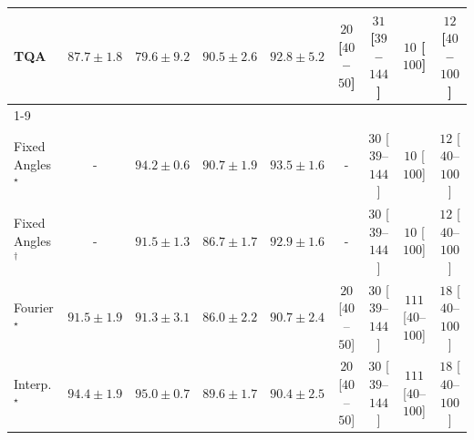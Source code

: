 \begin{tabular}{l|cccc|cccc|}
TQA & {\cellcolor[HTML]{EE7617}} \color[HTML]{F1F1F1} $87.7\pm 1.8$ & {\cellcolor[HTML]{FED36F}} \color[HTML]{000000} $79.6\pm 9.2$ & {\cellcolor[HTML]{D75908}} \color[HTML]{F1F1F1} $90.5\pm 2.6$ & {\cellcolor[HTML]{BC4503}} \color[HTML]{F1F1F1} $92.8\pm 5.2$ & {\cellcolor[HTML]{FDE4E1}} \color[HTML]{000000} $20$ [$40$--$50$] & {\cellcolor[HTML]{FDD8D5}} \color[HTML]{000000} $31$ [$39$--$144$] & {\cellcolor[HTML]{FEEEEB}} \color[HTML]{000000} $10$ [$100$] & {\cellcolor[HTML]{FEECE9}} \color[HTML]{000000} $12$ [$40$--$100$] \\
\cline{1-9}
\multicolumn{9}{c}{\rule{0pt}{8pt}PP} \\
\midrule
Fixed Angles$^\star$ & {\cellcolor[HTML]{000000}} \color[HTML]{F1F1F1} {\cellcolor{white}} \color{black} - & {\cellcolor[HTML]{0A703A}} \color[HTML]{F1F1F1} $94.2\pm 0.6$ & {\cellcolor[HTML]{2C8F4B}} \color[HTML]{F1F1F1} $90.7\pm 1.9$ & {\cellcolor[HTML]{11753D}} \color[HTML]{F1F1F1} $93.5\pm 1.6$ & {\cellcolor[HTML]{000000}} \color[HTML]{F1F1F1} {\cellcolor{white}} \color{black} - & {\cellcolor[HTML]{FDD9D6}} \color[HTML]{000000} $30$ [$39$--$144$] & {\cellcolor[HTML]{FEEEEB}} \color[HTML]{000000} $10$ [$100$] & {\cellcolor[HTML]{FEECE9}} \color[HTML]{000000} $12$ [$40$--$100$] \\
Fixed Angles$^\dagger$ & {\cellcolor[HTML]{000000}} \color[HTML]{F1F1F1} {\cellcolor{white}} \color{black} - & {\cellcolor[HTML]{258745}} \color[HTML]{F1F1F1} $91.5\pm 1.3$ & {\cellcolor[HTML]{5AB76A}} \color[HTML]{F1F1F1} $86.7\pm 1.7$ & {\cellcolor[HTML]{177B3F}} \color[HTML]{F1F1F1} $92.9\pm 1.6$ & {\cellcolor[HTML]{000000}} \color[HTML]{F1F1F1} {\cellcolor{white}} \color{black} - & {\cellcolor[HTML]{FDD9D6}} \color[HTML]{000000} $30$ [$39$--$144$] & {\cellcolor[HTML]{FEEEEB}} \color[HTML]{000000} $10$ [$100$] & {\cellcolor[HTML]{FEECE9}} \color[HTML]{000000} $12$ [$40$--$100$] \\
Fourier$^\star$ & {\cellcolor[HTML]{258745}} \color[HTML]{F1F1F1} $91.5\pm 1.9$ & {\cellcolor[HTML]{268846}} \color[HTML]{F1F1F1} $91.3\pm 3.1$ & {\cellcolor[HTML]{64BC6F}} \color[HTML]{F1F1F1} $86.0\pm 2.2$ & {\cellcolor[HTML]{2C8F4B}} \color[HTML]{F1F1F1} $90.7\pm 2.4$ & {\cellcolor[HTML]{FDE4E1}} \color[HTML]{000000} $20$ [$40$--$50$] & {\cellcolor[HTML]{FDD9D6}} \color[HTML]{000000} $30$ [$39$--$144$] & {\cellcolor[HTML]{E23E99}} \color[HTML]{F1F1F1} $111$ [$40$--$100$] & {\cellcolor[HTML]{FEE6E3}} \color[HTML]{000000} $18$ [$40$--$100$] \\
Interp.$^\star$ & {\cellcolor[HTML]{086E3A}} \color[HTML]{F1F1F1} $94.4\pm 1.9$ & {\cellcolor[HTML]{016937}} \color[HTML]{F1F1F1} $95.0\pm 0.7$ & {\cellcolor[HTML]{359C53}} \color[HTML]{F1F1F1} $89.6\pm 1.7$ & {\cellcolor[HTML]{2F934D}} \color[HTML]{F1F1F1} $90.4\pm 2.5$ & {\cellcolor[HTML]{FDE4E1}} \color[HTML]{000000} $20$ [$40$--$50$] & {\cellcolor[HTML]{FDD9D6}} \color[HTML]{000000} $30$ [$39$--$144$] & {\cellcolor[HTML]{E23E99}} \color[HTML]{F1F1F1} $111$ [$40$--$100$] & {\cellcolor[HTML]{FEE6E3}} \color[HTML]{000000} $18$ [$40$--$100$] \\

\end{tabular}
